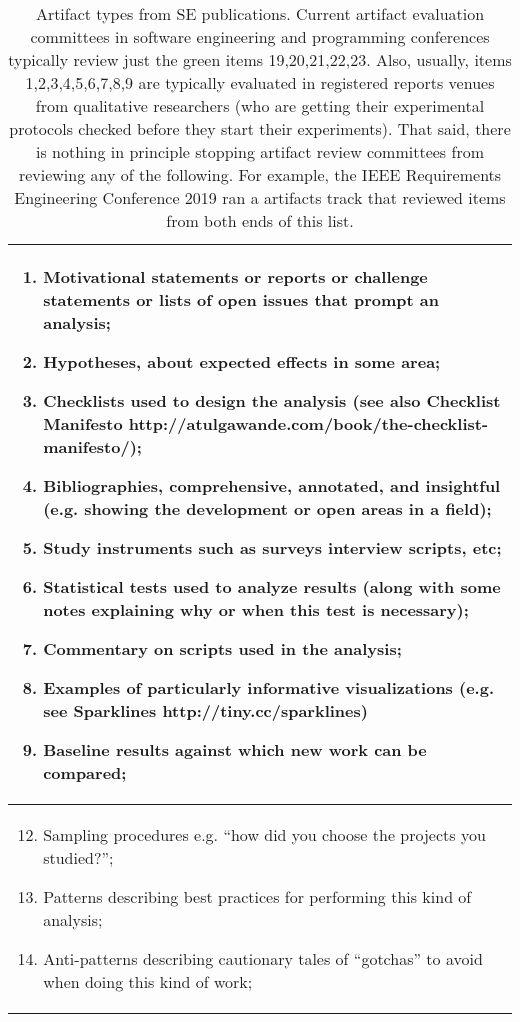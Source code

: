 
\begin{table}[!t]
\caption{Artifact types from SE publications. Current artifact evaluation committees in software engineering and programming conferences typically review just the green items 19,20,21,22,23.
Also, usually, items 1,2,3,4,5,6,7,8,9 are typically  evaluated in 
registered reports venues \cite{chambers2019s} from qualitative researchers (who are getting their experimental protocols checked before they start their experiments).
That said, there is nothing in principle stopping artifact review committees from 
reviewing any of the following. For example, the IEEE Requirements Engineering Conference 2019 ran a artifacts track that reviewed items from both ends of this list.}\label{types}
{\scriptsize
\begin{tabular}{|p{.96\linewidth}|}\hline
\rowcolor{gray!15}\begin{enumerate}
\item
Motivational statements or reports or challenge statements or lists of open issues that prompt an analysis;
\item Hypotheses, about expected effects in some area;
\item Checklists used to design the analysis (see also   Checklist Manifesto http://atulgawande.com/book/the-checklist-manifesto/);
\item Bibliographies, comprehensive, annotated, and insightful (e.g. showing the development or open areas in a field);
\item Study instruments such as surveys interview scripts, etc;
\item Statistical tests used to analyze results (along with some notes explaining why or when this test is necessary);
\item Commentary on scripts used in the analysis;
\item Examples of particularly informative visualizations (e.g. see Sparklines
http://tiny.cc/sparklines)
\item Baseline results against which new work can be compared;
\end{enumerate}
\\\hline
\begin{enumerate}
 \setcounter{enumi}{11}
\item Sampling procedures e.g. ``how did you choose the projects you studied?'';
\item Patterns describing best practices for performing this kind of analysis;
\item Anti-patterns describing cautionary tales of ``gotchas'' to avoid when doing this kind of work;

\end{enumerate}
\end{tabular}}
\end{table}
